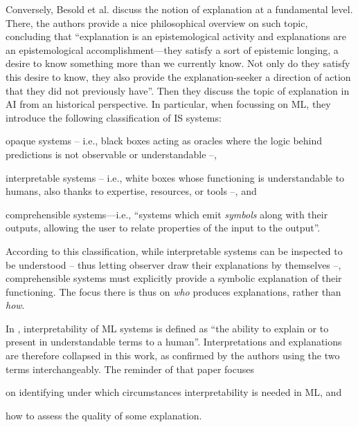 \documentclass[12pt,a4paper,openright,twoside]{book}
\begin{document}
Conversely, Besold et al. \cite{BesoldU2018} discuss the notion of explanation at a fundamental level.
%
There, the authors provide a nice philosophical overview on such topic, concluding that ``explanation is an epistemological activity and explanations are an epistemological accomplishment---they satisfy a sort of epistemic longing, a desire to know something more than we currently know. Not only do they satisfy this desire to know, they also provide the explanation-seeker a direction of action that they did not previously have''.
%
Then they discuss the topic of explanation in AI from an historical perspective.
%
In particular, when focussing on ML, they introduce the following classification of IS systems:
%
\begin{inlinelist}
    \item opaque systems -- i.e., black boxes acting as oracles where the logic behind predictions is not observable or understandable --,

    \item interpretable systems -- i.e., white boxes whose functioning is understandable to humans, also thanks to expertise, resources, or tools --, and

    \item comprehensible systems---i.e., ``systems which emit \emph{symbols} along with their outputs, allowing the user to relate properties of the input to the output''.
\end{inlinelist}
%
According to this classification, while interpretable systems can be inspected to be understood -- thus letting observer draw their explanations by themselves --, comprehensible systems must explicitly provide a symbolic explanation of their functioning.
%
The focus there is thus on \emph{who} produces explanations, rather than \emph{how}.

In \cite{DoshiVelezK2017}, interpretability of ML systems is defined as ``the ability to explain or to present in understandable terms to a human''.
%
Interpretations and explanations are therefore collapsed in this work, as confirmed by the authors using the two terms interchangeably.
%
The reminder of that paper focuses
\begin{inlinelist}
    \item on identifying under which circumstances interpretability is needed in ML, and
    \item how to assess the quality of some explanation.
\end{inlinelist}
\end{document}
